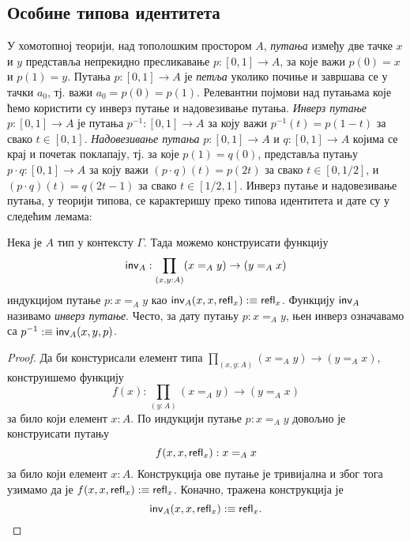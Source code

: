 \documentclass[12pt,oneside]{memoir}
\begin{document}
\subsection{Особине типова идентитета}

У хомотопној теорији, над тополошким простором $A$, \emph{путања} између две тачке $x$ и $y$ представља непрекидно пресликавање $p : [0, 1] \to A$, за које важи $p(0) = x$ и $p(1) = y$. Путања $p : [0, 1] \to A$ је \emph{петља} уколико почиње и завршава се у тачки $a_0$, тј. важи $a_0 = p(0) = p(1)$. Релевантни појмови над путањама које ћемо користити су инверз путање и надовезивање путања. \emph{Инверз путање} $p : [0, 1] \to A$ је путања $p^{-1} : [0, 1] \to A$ за коју важи $p^{-1} (t) = p (1 - t)$ за свако $t \in [0, 1]$. \emph{Надовезивање путања} $p : [0, 1] \to A$ и $q : [0, 1] \to A$ којима се крај и почетак поклапају, тј. за које $p(1) = q(0)$, представља путању $p \cdot q : [0, 1] \to A$ за коју важи $(p \cdot q) (t) = p(2t)$ за свако $t \in [0, 1/2]$, и $(p \cdot q) (t) = q(2t - 1)$ за свако $t \in [1/2, 1]$. Инверз путање и надовезивање путања, у теорији типова, се карактеришу преко типова идентитета и дате су у следећим лемама:

\begin{lemma}
    \label{lmm:inv}
    Нека је $A$ тип у контексту $\Gamma$. Тада можемо конструисати функцију \[\mathsf{inv}_{A} : \prod_{(x, y : A)} (x =_A y) \to (y =_A x)\] индукцијом путање $p : x =_A y$ као $\mathsf{inv}_{A} (x, x, \mathsf{refl}_{x}) :\equiv \mathsf{refl}_{x}$. Функцију $\mathsf{inv}_{A}$ називамо \emph{инверз путање}. Често, за дату путању $p : x =_A y$, њен инверз означавамо са $p^{-1} :\equiv \mathsf{inv}_{A}(x, y, p)$.
\end{lemma}
\begin{proof}
    Да би констурисали елемент типа $\prod_{(x,y : A)} (x =_A y) \to (y =_A x)$, конструишемо функцију \[ f(x) : \prod_{(y : A)} (x =_A y) \to (y =_A x)\] за било који елемент $x : A$. По индукцији путање $p : x =_A y$ довољно је конструисати путању \[ f(x, x, \mathsf{refl}_{x}) : x =_A x \] за било који елемент $x : A$. Конструкција ове путање је тривијална и због тога узимамо да је $f (x, x, \mathsf{refl}_{x}) :\equiv \mathsf{refl}_{x}$. Коначно, тражена конструкција је \[ \mathsf{inv}_{A} (x, x, \mathsf{refl}_{x}) :\equiv \mathsf{refl}_{x}. \] 
\end{proof}
\end{document}

